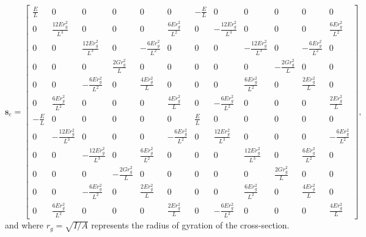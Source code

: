 \documentclass[12pt,a4paper,article]{memoir} %
\begin{document}
\begin{equation}
	\mathbf{s}_e = \left[ \begin{array}{cccccccccccc} \frac{E}{L} &  0 &  0 &  0 &  0 &  0 & -\frac{E}{L} &  0 &  0 &  0 &  0 &  0 \\
                                                                  0 & \frac{12Er_g^2}{L^3} &  0 &  0 &  0 & \frac{6Er_g^2}{L^2} &  0 & -\frac{12Er_g^2}{L^3} &  0 &  0 &  0 & \frac{6Er_g^2}{L^2} \\
     						  0 &  0 & \frac{12Er_g^2}{L^3} &  0 & -\frac{6Er_g^2}{L^2} &  0 &  0 &  0 & -\frac{12Er_g^2}{L^3} &  0 & -\frac{6Er_g^2}{L^2} &  0 \\
     						0 &  0 &  0 & \frac{2Gr_g^2}{L} &  0 &  0 &  0 &  0 &  0 & -\frac{2Gr_g^2}{L} &  0 &  0 \\
    						 0 &  0 & -\frac{6Er_g^2}{L^2} &  0 & \frac{4Er_g^2}{L} &  0 &  0 &  0 & \frac{6Er_g^2}{L^2} &  0 & \frac{2Er_g^2}{L} &  0 \\
    						 0 & \frac{6Er_g^2}{L^2} &  0 &  0 &  0 & \frac{4Er_g^2}{L} &  0 & -\frac{6Er_g^2}{L^2} &  0 &  0 &  0 & \frac{2Er_g^2}{L} \\
    						-\frac{E}{L} &  0 &  0 &  0 &  0 &  0 & \frac{E}{L} &  0 &  0 &  0 &  0 &  0 \\
   						  0 & -\frac{12Er_g^2}{L^3} &  0 &  0 &  0 & -\frac{6Er_g^2}{L^2} &  0 & \frac{12Er_g^2}{L^3} &  0 &  0 &  0 & -\frac{6Er_g^2}{L^2} \\
   						  0 &  0 & -\frac{12Er_g^2}{L^3} &  0 & \frac{6Er_g^2}{L^2} &  0 &  0 &  0 & \frac{12Er_g^2}{L^3} &  0 & \frac{6Er_g^2}{L^2} &  0 \\
   						  0 &  0 &  0 & -\frac{2Gr_g^2}{L} &  0 &  0 &  0 &  0 &  0 & \frac{2Gr_g^2}{L} &  0 &  0 \\
    						 0 &  0 & -\frac{6Er_g^2}{L^2} &  0 & \frac{2Er_g^2}{L} &  0 &  0 &  0 & \frac{6Er_g^2}{L^2} &  0 & \frac{4Er_g^2}{L} &  0 \\
   						  0 & \frac{6Er_g^2}{L^2} &  0 &  0 &  0 & \frac{2Er_g^2}{L} &  0 & -\frac{6Er_g^2}{L^2} &  0 &  0 &  0 & \frac{4Er_g^2}{L} \end{array} \right],
\end{equation}
and where $r_g = \sqrt{I/A}$ represents the radius of gyration of the cross-section.
\end{document}
